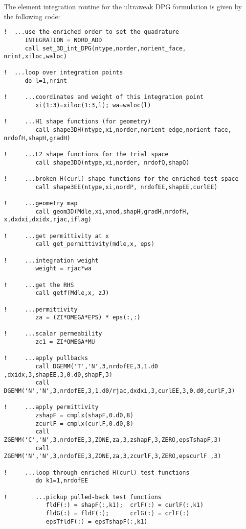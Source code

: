 The element integration routine for the ultraweak DPG formulation is given by the following code:
\begin{lstlisting}[mathescape,caption=\file{MAXWELL/ULTRAWEAK\_DPG/}\routine{elem\_maxwell}: element integration]
!  ...use the enriched order to set the quadrature
      INTEGRATION = NORD_ADD
      call set_3D_int_DPG(ntype,norder,norient_face, nrint,xiloc,waloc)

!  ...loop over integration points
      do l=1,nrint

!     ...coordinates and weight of this integration point
         xi(1:3)=xiloc(1:3,l); wa=waloc(l)

!     ...H1 shape functions (for geometry)
         call shape3DH(ntype,xi,norder,norient_edge,norient_face, nrdofH,shapH,gradH)

!     ...L2 shape functions for the trial space
         call shape3DQ(ntype,xi,norder, nrdofQ,shapQ)

!     ...broken H(curl) shape functions for the enriched test space
         call shape3EE(ntype,xi,nordP, nrdofEE,shapEE,curlEE)

!     ...geometry map
         call geom3D(Mdle,xi,xnod,shapH,gradH,nrdofH, x,dxdxi,dxidx,rjac,iflag)

!     ...get permittivity at x
         call get_permittivity(mdle,x, eps)

!     ...integration weight
         weight = rjac*wa

!     ...get the RHS
         call getf(Mdle,x, zJ)

!     ...permittivity
         za = (ZI*OMEGA*EPS) * eps(:,:)

!     ...scalar permeability
         zc1 = ZI*OMEGA*MU

!     ...apply pullbacks
         call DGEMM('T','N',3,nrdofEE,3,1.d0     ,dxidx,3,shapEE,3,0.d0,shapF,3)
         call DGEMM('N','N',3,nrdofEE,3,1.d0/rjac,dxdxi,3,curlEE,3,0.d0,curlF,3)

!     ...apply permittivity
         zshapF = cmplx(shapF,0.d0,8)
         zcurlF = cmplx(curlF,0.d0,8)
         call ZGEMM('C','N',3,nrdofEE,3,ZONE,za,3,zshapF,3,ZERO,epsTshapF,3)
         call ZGEMM('N','N',3,nrdofEE,3,ZONE,za,3,zcurlF,3,ZERO,epscurlF ,3)

!     ...loop through enriched H(curl) test functions
         do k1=1,nrdofEE

!        ...pickup pulled-back test functions
            fldF(:) = shapF(:,k1);  crlF(:) = curlF(:,k1)
            fldG(:) = fldF(:);      crlG(:) = crlF(:)
            epsTfldF(:) = epsTshapF(:,k1)


\end{lstlisting}
